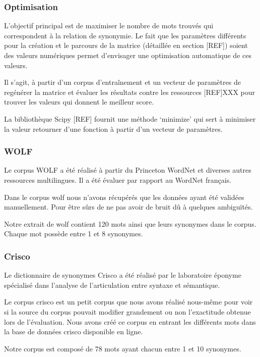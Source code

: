 \subsubsection{Optimisation}

L'objectif principal est de maximiser le nombre de mots trouvés qui 
correspondent à la relation de synonymie. Le fait que les paramètres différents 
pour la création et le parcours de la matrice (détaillée en section [REF]) 
soient des valeurs numériques permet d'envisager une optimisation automatique de 
ces valeurs.

Il s'agit, à partir d'un corpus d'entraînement et un vecteur de paramètres de 
regénérer la matrice et évaluer les résultats contre les ressources [REF]XXX 
pour trouver les valeurs qui donnent le meilleur score.

La bibliothèque Scipy [REF] fournit une méthode \lq{minimize}\rq{} qui sert à 
minimiser la valeur retourner d'une fonction à partir d'un vecteur de 
paramètres.

\subsubsection{WOLF}

Le corpus WOLF a été réalisé à partir du Princeton WordNet et diverses autres 
ressources multilingues. Il a été évaluer par rapport au WordNet français.

Dans le corpus wolf nous n'avons récupérés que les données ayant été validées 
manuellement. Pour être sûrs de ne pas avoir de bruit dû à quelques ambiguïtés.

Notre extrait de wolf contient 120 mots ainsi que leurs synonymes dans le 
corpus. Chaque mot possède entre 1 et 8 synonymes.

\subsubsection{Crisco}

Le dictionnaire de synonymes Crisco a été réalisé par le laboratoire éponyme 
spécialisé dans l’analyse de l’articulation entre syntaxe et sémantique.

Le corpus crisco est un petit corpus que nous avons réalisé nous-même pour voir 
si la source du corpus pouvait modifier grandement ou non l'exactitude obtenue 
lors de l'évaluation. Nous avons créé ce corpus en entrant les différents mots 
dans la base de données crisco disponible en ligne.

Notre corpus est composé de 78 mots ayant chacun entre 1 et 10 synonymes.


